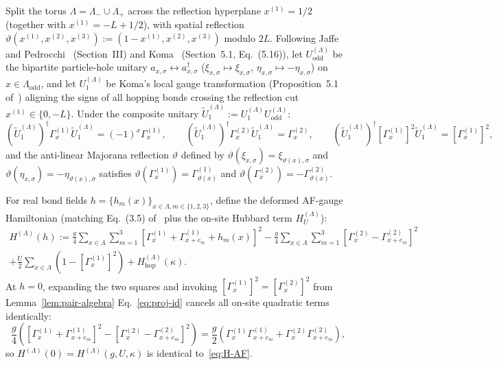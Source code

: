 \documentclass[11pt]{article}
\theoremstyle{definition}
\theoremstyle{remark}
\begin{document}
Split the torus $\Lambda = \Lambda_- \cup \Lambda_+$ across the reflection hyperplane $x^{(1)} = 1/2$ (together with $x^{(1)} = -L + 1/2$), with spatial reflection $\vartheta(x^{(1)}, x^{(2)}, x^{(3)}) := (1 - x^{(1)}, x^{(2)}, x^{(3)})$ modulo $2L$. Following Jaffe and Pedrocchi~\cite{jaffe2015a} (Section~III) and Koma~\cite{koma2022} (Section~5.1, Eq.~(5.16)), let $U_{\mathrm{odd}}^{(\Lambda)}$ be the bipartite particle-hole unitary $a_{x,\sigma} \leftrightarrow a_{x,\sigma}^\dagger$ ($\xi_{x,\sigma} \mapsto \xi_{x,\sigma}$, $\eta_{x,\sigma} \mapsto -\eta_{x,\sigma}$) on $x \in \Lambda_{\mathrm{odd}}$, and let $U_1^{(\Lambda)}$ be Koma's local gauge transformation (Proposition~5.1 of~\cite{koma2022}) aligning the signs of all hopping bonds crossing the reflection cut $x^{(1)} \in \{0, -L\}$. Under the composite unitary $\tilde{U}_1^{(\Lambda)} := U_1^{(\Lambda)} U_{\mathrm{odd}}^{(\Lambda)}$:
\begin{equation}\label{eq:u1tilde-action}
(\tilde{U}_1^{(\Lambda)})^\dagger \Gamma_x^{(1)} \tilde{U}_1^{(\Lambda)} = (-1)^x \Gamma_x^{(1)}, \qquad (\tilde{U}_1^{(\Lambda)})^\dagger \Gamma_x^{(2)} \tilde{U}_1^{(\Lambda)} = \Gamma_x^{(2)}, \qquad (\tilde{U}_1^{(\Lambda)})^\dagger [\Gamma_x^{(1)}]^2 \tilde{U}_1^{(\Lambda)} = [\Gamma_x^{(1)}]^2,
\end{equation}
and the anti-linear Majorana reflection $\vartheta$ defined by $\vartheta(\xi_{x,\sigma}) = \xi_{\vartheta(x),\sigma}$ and $\vartheta(\eta_{x,\sigma}) = -\eta_{\vartheta(x),\sigma}$ satisfies $\vartheta(\Gamma_x^{(1)}) = \Gamma_{\vartheta(x)}^{(1)}$ and $\vartheta(\Gamma_x^{(2)}) = -\Gamma_{\vartheta(x)}^{(2)}$.

For real bond fields $h = \{h_m(x)\}_{x \in \Lambda, m \in \{1,2,3\}}$, define the deformed AF-gauge Hamiltonian (matching Eq.~(3.5) of~\cite{koma2022} plus the on-site Hubbard term $H_U^{(\Lambda)}$):
\begin{multline}\label{eq:H-deformed}
H^{(\Lambda)}(h) := \frac{g}{4} \sum_{x \in \Lambda} \sum_{m=1}^3 \left[\Gamma_x^{(1)} + \Gamma_{x+e_m}^{(1)} + h_m(x)\right]^2 - \frac{g}{4} \sum_{x \in \Lambda} \sum_{m=1}^3 \left[\Gamma_x^{(2)} - \Gamma_{x+e_m}^{(2)}\right]^2 \\
+ \frac{U}{2} \sum_{x \in \Lambda} \left(1 - [\Gamma_x^{(1)}]^2\right) + H_{\mathrm{hop}}^{(\Lambda)}(\kappa).
\end{multline}
At $h = 0$, expanding the two squares and invoking $[\Gamma_x^{(1)}]^2 = [\Gamma_x^{(2)}]^2$ from Lemma~\ref{lem:pair-algebra} Eq.~\eqref{eq:proj-id} cancels all on-site quadratic terms identically:
\begin{equation}\label{eq:sq-complete}
\frac{g}{4}\left([\Gamma_x^{(1)} + \Gamma_{x+e_m}^{(1)}]^2 - [\Gamma_x^{(2)} - \Gamma_{x+e_m}^{(2)}]^2\right) = \frac{g}{2}\left(\Gamma_x^{(1)}\Gamma_{x+e_m}^{(1)} + \Gamma_x^{(2)}\Gamma_{x+e_m}^{(2)}\right),
\end{equation}
so $H^{(\Lambda)}(0) = H^{(\Lambda)}(g, U, \kappa)$ is identical to~\eqref{eq:H-AF}.
\end{document}
